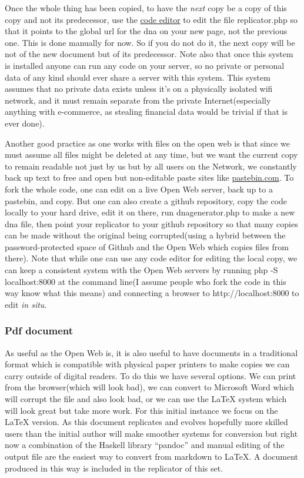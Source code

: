 \documentclass[12pt,a4paper]{amsart}
\numberwithin{equation}{section}
\begin{document}
Once the whole thing has been copied, to have the \emph{next} copy be a
copy of this copy and not its predecessor, use the
\href{editor.php}{code editor} to edit the file replicator.php so that
it points to the global url for the dna on your new page, not the
previous one. This is done manually for now. So if you do not do it, the
next copy will be not of the new document but of its predecessor. Note
also that once this system is installed anyone can run any code on your
server, so no private or personal data of any kind should ever share a
server with this system. This system assumes that no private data exists
unless it's on a physically isolated wifi network, and it must remain
separate from the private Internet(especially anything with e-commerce,
as stealing financial data would be trivial if that is ever done).

Another good practice as one works with files on the open web is that
since we must assume all files might be deleted at any time, but we want
the current copy to remain readable not just by us but by all users on
the Network, we constantly back up text to free and open but
non-editable paste sites like
\href{https://pastebin.com/}{pastebin.com}. To fork the whole code, one
can edit on a live Open Web server, back up to a pastebin, and copy. But
one can also create a github repository, copy the code locally to your
hard drive, edit it on there, run dnagenerator.php to make a new dna
file, then point your replicator to your github repository so that many
copies can be made without the original being corrupted(using a hybrid
between the password-protected space of Github and the Open Web which
copies files from there). Note that while one can use any code editor
for editing the local copy, we can keep a consistent system with the
Open Web servers by running php -S localhost:8000 at the command line(I
assume people who fork the code in this way know what this means) and
connecting a browser to http://localhost:8000 to edit \emph{in situ}.

\subsubsection{Pdf document}\label{pdf-document}

As useful as the Open Web is, it is also useful to have documents in a
traditional format which is compatible with physical paper printers to
make copies we can carry outside of digital readers. To do this we have
several options. We can print from the browser(which will look bad), we
can convert to Microsoft Word which will corrupt the file and also look
bad, or we can use the LaTeX system which will look great but take more
work. For this initial instance we focus on the LaTeX version. As this
document replicates and evolves hopefully more skilled users than the
initial author will make smoother systems for conversion but right now a
combination of the Haskell library ``pandoc'' and manual editing of the
output file are the easiest way to convert from markdown to LaTeX. A
document produced in this way is included in the replicator of this set.
\end{document}
